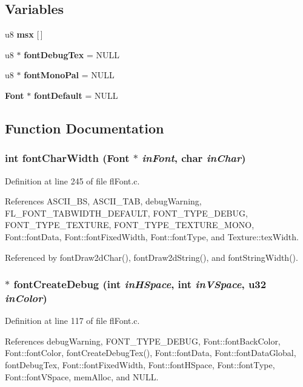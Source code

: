 \subsection*{Variables}
\begin{CompactItemize}
\item 
u8 {\bf msx} [$\,$]
\item 
u8 $\ast$ {\bf font\-Debug\-Tex} = NULL
\item 
u8 $\ast$ {\bf font\-Mono\-Pal} = NULL
\item 
{\bf Font} $\ast$ {\bf font\-Default} = NULL
\end{CompactItemize}


\subsection{Function Documentation}
\subsubsection{\setlength{\rightskip}{0pt plus 5cm}int font\-Char\-Width ({\bf Font} $\ast$ {\em in\-Font}, char {\em in\-Char})}\label{flFont_8c_885fc7115e929b241e957568f1e15be5}




Definition at line 245 of file fl\-Font.c.

References ASCII\_\-BS, ASCII\_\-TAB, debug\-Warning, FL\_\-FONT\_\-TABWIDTH\_\-DEFAULT, FONT\_\-TYPE\_\-DEBUG, FONT\_\-TYPE\_\-TEXTURE, FONT\_\-TYPE\_\-TEXTURE\_\-MONO, Font::font\-Data, Font::font\-Fixed\-Width, Font::font\-Type, and Texture::tex\-Width.

Referenced by font\-Draw2d\-Char(), font\-Draw2d\-String(), and font\-String\-Width().
\subsubsection{$\ast$ font\-Create\-Debug (int {\em in\-HSpace}, int {\em in\-VSpace}, u32 {\em in\-Color})}\label{flFont_8c_e88ed5efe4bc9f93200dd3645a740a89}




Definition at line 117 of file fl\-Font.c.

References debug\-Warning, FONT\_\-TYPE\_\-DEBUG, Font::font\-Back\-Color, Font::font\-Color, font\-Create\-Debug\-Tex(), Font::font\-Data, Font::font\-Data\-Global, font\-Debug\-Tex, Font::font\-Fixed\-Width, Font::font\-HSpace, Font::font\-Type, Font::font\-VSpace, mem\-Alloc, and NULL.

